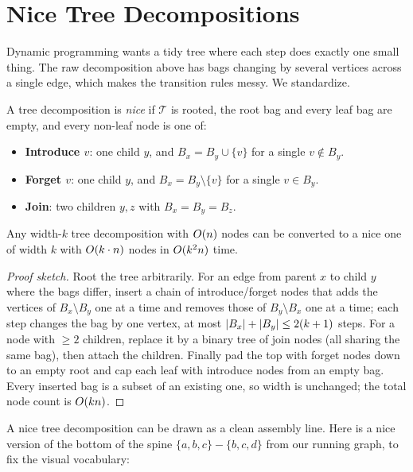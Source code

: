 \section{Nice Tree Decompositions}
\label{ch24:nice}

Dynamic programming wants a tidy tree where each step does exactly one small
thing. The raw decomposition above has bags changing by several vertices across a
single edge, which makes the transition rules messy. We standardize.

\begin{definition}
\label{ch24:def-nice}
A tree decomposition is \emph{nice} if $\mathcal{T}$ is rooted, the root bag and
every leaf bag are empty, and every non-leaf node is one of:
\begin{itemize}
  \item \textbf{Introduce $v$}: one child $y$, and $B_x = B_y\cup\{v\}$ for a
        single $v\notin B_y$.
  \item \textbf{Forget $v$}: one child $y$, and $B_x = B_y\setminus\{v\}$ for a
        single $v\in B_y$.
  \item \textbf{Join}: two children $y,z$ with $B_x = B_y = B_z$.
\end{itemize}
\end{definition}

\begin{proposition}
\label{ch24:prop-nice}
Any width-$k$ tree decomposition with $O(n)$ nodes can be converted to a nice
one of width $k$ with $O(k\cdot n)$ nodes in $O(k^2 n)$ time.
\end{proposition}

\begin{proof}[Proof sketch]
Root the tree arbitrarily. For an edge from parent $x$ to child $y$ where the bags
differ, insert a chain of introduce/forget nodes that adds the vertices of
$B_x\setminus B_y$ one at a time and removes those of $B_y\setminus B_x$ one at a
time; each step changes the bag by one vertex, at most $\lvert B_x\rvert+\lvert B_y\rvert\le
2(k+1)$ steps. For a node with $\ge 2$ children, replace it by a binary tree of
join nodes (all sharing the same bag), then attach the children. Finally pad the
top with forget nodes down to an empty root and cap each leaf with introduce nodes
from an empty bag. Every inserted bag is a subset of an existing one, so width is
unchanged; the total node count is $O(kn)$.
\end{proof}

A nice tree decomposition can be drawn as a clean assembly line. Here is a nice
version of the bottom of the spine $\{a,b,c\}-\{b,c,d\}$ from our running graph,
to fix the visual vocabulary:


